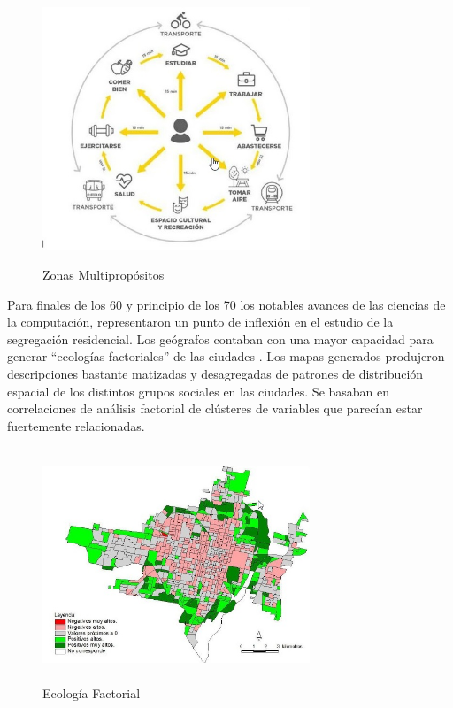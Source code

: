 \begin{figure}[htb]
	\centering
	\includegraphics[width=8cm, height=8cm]{Images/ZonaMultiproposito.jpg} 
	\caption{Zonas Multipropósitos}
\end{figure} 

Para finales de los 60 y principio de los 70 los notables avances de las ciencias de la computación, representaron un punto de inflexión en el estudio de la segregación residencial. Los geógrafos contaban con una mayor capacidad para generar “ecologías factoriales” de las ciudades \cite{Clarke1966PopulationPI} \cite{Johnston1978BerryBJ}. Los mapas generados produjeron descripciones bastante matizadas y desagregadas de patrones de distribución espacial de los distintos grupos sociales en las ciudades. Se basaban en correlaciones de análisis factorial de clústeres de variables que parecían estar fuertemente relacionadas.

\begin{figure}[htb]
	\centering
	\includegraphics[width=8cm, height=7cm]{Images/EcologiaFactorial.jpg} 
	\caption{Ecología Factorial}
\end{figure} 

